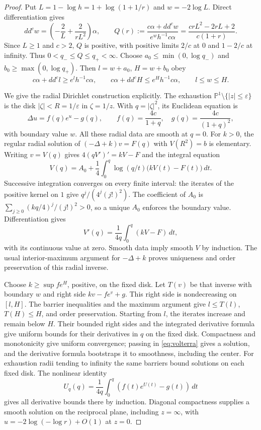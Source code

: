 \documentclass[11pt]{article}
\newcommand{\ddc}{dd^c}
\newcommand{\CP}{\mathbb P}
\begin{document}
\begin{proof}
Put $L=1-\log h=1+\log(1+1/r)$ and $w=-2\log L$.
Direct differentiation gives
\[
 \ddc w=\left(-\frac2L+\frac2{rL^2}\right)\alpha,\qquad
 Q(r):=\frac{c\alpha+\ddc w}{e^wh^{-1}c\alpha}
       =\frac{crL^2-2rL+2}{c(1+r)}.
\]
Since $L\geq1$ and $c>2$, $Q$ is positive, with positive limits
$2/c$ at $0$ and $1-2/c$ at infinity. Thus
$0<q_-\leq Q\leq q_+<\infty$.
Choose $a_0\leq\min(0,\log q_-)$ and
$b_0\geq\max(0,\log q_+)$. Then $l=w+a_0$, $H=w+b_0$ obey
\[
 c\alpha+\ddc l\geq e^lh^{-1}c\alpha,\qquad
 c\alpha+\ddc H\leq e^Hh^{-1}c\alpha,\qquad l\leq w\leq H.
\]

We give the radial Dirichlet construction explicitly. The exhaustion
$\CP^1\setminus\{|z|\leq\varepsilon\}$ is the disk
$|\zeta|<R=1/\varepsilon$ in $\zeta=1/z$.
With $q=|\zeta|^2$, its Euclidean equation is
\[
 \Delta u=f(q)e^u-g(q),\qquad
 f(q)=\frac{4c}{1+q},\quad g(q)=\frac{4c}{(1+q)^2},
\]
with boundary value $w$. All these radial data are smooth at $q=0$.
For $k>0$, the regular radial solution of
$(-\Delta+k)v=F(q)$ with $V(R^2)=b$ is elementary.
Writing $v=V(q)$ gives $4(qV')'=kV-F$ and the integral equation
\begin{equation}\label{eq:volterra}
 V(q)=A_0+\frac14\int_0^q\log(q/t)\bigl(kV(t)-F(t)\bigr)\,dt.
\end{equation}
Successive integration converges on every finite interval: the iterates
of the positive kernel on $1$ give $q^j/(4^j(j!)^2)$.
The coefficient of $A_0$ is
$\sum_{j\geq0}(kq/4)^j/(j!)^2>0$, so a unique $A_0$
enforces the boundary value. Differentiation gives
\[
 V'(q)=\frac1{4q}\int_0^q(kV-F)\,dt,
\]
with its continuous value at zero. Smooth data imply smooth $V$ by
induction. The usual interior-maximum argument for $-\Delta+k$
proves uniqueness and order preservation of this radial inverse.

Choose $k\geq\sup f e^H$, positive, on the fixed disk.
Let $T(v)$ be that inverse with boundary $w$ and right side
$kv-fe^v+g$. This right side is nondecreasing on $[l,H]$.
The barrier inequalities and the maximum argument give
$l\leq T(l)$, $T(H)\leq H$, and order preservation.
Starting from $l$, the iterates increase and remain below $H$.
Their bounded right sides and the integrated derivative formula give
uniform bounds for their derivatives in $q$ on the fixed disk.
Compactness and monotonicity give uniform convergence; passing in
\eqref{eq:volterra} gives a solution, and the derivative formula
bootstraps it to smoothness, including the center.
For exhaustion radii tending to infinity the same barriers bound
solutions on each fixed disk. The nonlinear identity
\[
 U_q(q)=\frac1{4q}\int_0^q(f(t)e^{U(t)}-g(t))\,dt
\]
gives all derivative bounds there by induction.
Diagonal compactness supplies a smooth solution on the reciprocal
plane, including $z=\infty$, with
$u=-2\log(-\log r)+O(1)$ at $z=0$.


\end{proof}
\end{document}
